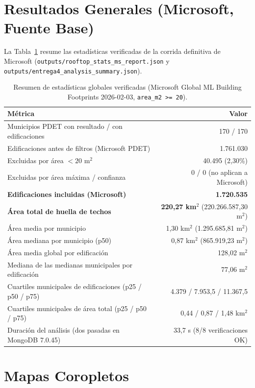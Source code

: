 \documentclass[11pt, a4paper]{article}
\begin{document}
\section{Resultados Generales (Microsoft, Fuente Base)}

La Tabla~\ref{tab:global} resume las estadísticas verificadas de la corrida definitiva de Microsoft (\texttt{outputs/rooftop\_stats\_ms\_report.json} y \texttt{outputs/entrega4\_analysis\_summary.json}).

\begin{table}[H]
\centering
\begin{tabular}{lr}
\toprule
\textbf{Métrica} & \textbf{Valor} \\
\midrule
Municipios PDET con resultado / con edificaciones & 170 / 170 \\
Edificaciones antes de filtros (Microsoft PDET) & 1.761.030 \\
Excluidas por área $< 20$ m$^2$ & 40.495 (2,30\%) \\
Excluidas por área máxima / confianza & 0 / 0 (no aplican a Microsoft) \\
\textbf{Edificaciones incluidas (Microsoft)} & \textbf{1.720.535} \\
\midrule
\textbf{Área total de huella de techos} & \textbf{220,27 km$^2$} (220.266.587,30 m$^2$) \\
Área media por municipio & 1,30 km$^2$ (1.295.685,81 m$^2$) \\
Área mediana por municipio (p50) & 0,87 km$^2$ (865.919,23 m$^2$) \\
Área media global por edificación & 128,02 m$^2$ \\
Mediana de las medianas municipales por edificación & 77,06 m$^2$ \\
\midrule
Cuartiles municipales de edificaciones (p25 / p50 / p75) & 4.379 / 7.953,5 / 11.367,5 \\
Cuartiles municipales de área total (p25 / p50 / p75) & 0,44 / 0,87 / 1,48 km$^2$ \\
\midrule
Duración del análisis (dos pasadas en MongoDB 7.0.45) & 33,7 s (8/8 verificaciones OK) \\
\bottomrule
\end{tabular}
\caption{Resumen de estadísticas globales verificadas (Microsoft Global ML Building Footprints 2026-02-03, \texttt{area\_m2 >= 20}).}
\label{tab:global}
\end{table}

\newpage
\section{Mapas Coropletos}
\end{document}
